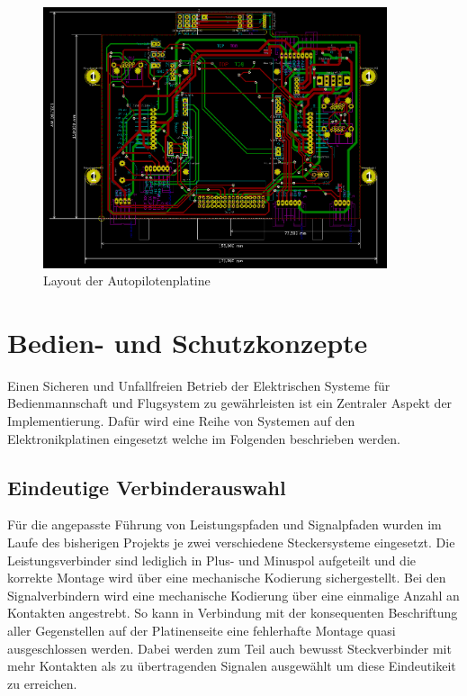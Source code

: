 \begin{figure}[H]
\centering
\includegraphics[width=0.9\textwidth]{bilder/Centerbox/Centerbox-Rear-Pixhawk_AUVSI_2016_rev-01-layout.png} 
\caption{Layout der Autopilotenplatine} 
\label{fig:Layout der Autopilotenplatine}
\end{figure}

\section{Bedien- und Schutzkonzepte}

Einen Sicheren und Unfallfreien Betrieb der Elektrischen Systeme für Bedienmannschaft und Flugsystem zu gewährleisten ist ein Zentraler Aspekt der Implementierung. Dafür wird eine Reihe von Systemen auf den Elektronikplatinen eingesetzt welche im Folgenden beschrieben werden.

\subsection{Eindeutige Verbinderauswahl}

Für die angepasste Führung von Leistungspfaden und Signalpfaden wurden im Laufe des bisherigen Projekts je zwei verschiedene Steckersysteme eingesetzt.
Die Leistungsverbinder sind lediglich in Plus- und Minuspol aufgeteilt und die korrekte Montage wird über eine mechanische Kodierung sichergestellt.
Bei den Signalverbindern wird eine mechanische Kodierung über eine einmalige Anzahl an Kontakten angestrebt. So kann in Verbindung mit der konsequenten Beschriftung aller Gegenstellen auf der Platinenseite eine fehlerhafte Montage quasi ausgeschlossen werden. Dabei werden zum Teil auch bewusst Steckverbinder mit mehr Kontakten als zu übertragenden Signalen ausgewählt um diese Eindeutikeit zu erreichen.

